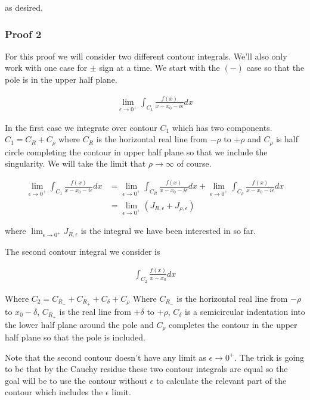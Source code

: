 \documentclass[12pt]{article}
\begin{document}
as desired.

\subsubsection{Proof 2}

For this proof we will consider two different contour integrals. We'll also only work with one case for $\pm$ sign at a time. We start with the $(-)$ case so that the pole is in the upper half plane.

\begin{align}
\lim_{\epsilon \rightarrow 0^+} \int_{C_1} \frac{f(x)}{x - x_0 - i \epsilon} dx
\end{align}

In the first case we integrate over contour $C_1$ which has two components. $C_1 = C_R + C_\rho$ where $C_R$ is the horizontal real line from $-\rho$ to $+\rho$ and $C_\rho$ is half circle completing the contour in upper half plane so that we include the singularity. We will take the limit that $\rho\rightarrow \infty$ of course.

\begin{align}
\lim_{\epsilon \rightarrow 0^+} \int_{C_1} \frac{f(x)}{x - x_0 - i \epsilon} dx &= \lim_{\epsilon \rightarrow 0^+} \int_{C_R} \frac{f(x)}{x - x_0 - i \epsilon} dx + \lim_{\epsilon \rightarrow 0^+} \int_{C_\rho} \frac{f(x)}{x - x_0 - i \epsilon} dx\\
&= \lim_{\epsilon \rightarrow 0^+}(J_{R,\epsilon} + J_{\rho,\epsilon})
\end{align}

where $\lim_{\epsilon \rightarrow 0^+}J_{R,\epsilon}$ is the integral we have been interested in so far.

The second contour integral we consider is

\begin{align}
\int_{C_2} \frac{f(x)}{x - x_0} dx
\end{align}

Where $C_2 = C_{R_-} + C_{R_+} + C_{\delta} + C_\rho$ Where $C_{R_-}$ is the horizontal real line from $-\rho$ to $x_0-\delta$, $C_{R_+}$ is the real line from $+\delta$ to $+\rho$, $C_\delta$ is a semicircular indentation into the lower half plane around the pole and $C_\rho$ completes the contour in the upper half plane so that the pole is included.

Note that the second contour doesn't have any limit as $\epsilon \rightarrow 0^+$. The trick is going to be that by the Cauchy residue these two contour integrals are equal so the goal will be to use the contour without $\epsilon$ to calculate the relevant part of the contour which includes the $\epsilon$ limit.
\end{document}
